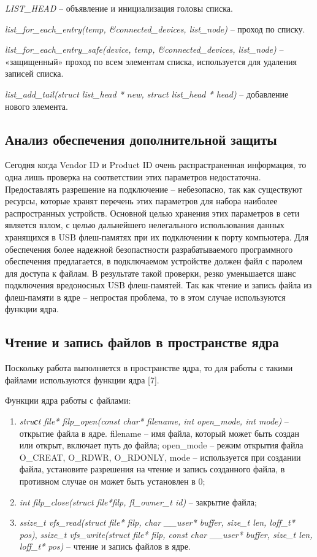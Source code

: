 \documentclass[a4paper, 10pt]{article}
\begin{document}
	\textit{LIST\_HEAD} -- объявление и инициализация головы списка.
	
	\textit{list\_for\_each\_entry(temp, \&connected\_devices, list\_node)} -- проход по списку.
	
	\textit{list\_for\_each\_entry\_safe(device, temp, \&connected\_devices, list\_node)} -- «защищенный» проход по всем элементам списка, используется для удаления записей списка.
	
	\textit{list\_add\_tail(struct list\_head * new, struct list\_head * head) }-- добавление нового элемента.
	
	\subsection{Анализ обеспечения дополнительной защиты}
		\hspace*{5mm} Сегодня когда Vendor ID и Product ID очень распрастраненная информация, то одна лишь проверка на соответствии этих параметров недостаточна. Предоставлять разрешение на подключение -- небезопасно, так как существуют ресурсы, которые хранят перечень этих параметров для набора наиболее распространных устройств. Основной целью хранения этих параметров в сети является взлом, с целью дальнейшего нелегального использования данных хранящихся в  USB флеш-памятях при их подключении к порту компьютера. Для обеспечения более надежной безопастности разрабатываемого программного обеспечения предлагается, в подключаемом устройстве должен файл с паролем для доступа к файлам. В результате такой проверки, резко уменьшается шанс подключения вредоносных USB флеш-памятей. Так как чтение и запись файла из флеш-памяти в ядре -- непростая проблема, то в этом случае используются функции ядра.
		
	\subsection{Чтение и запись файлов в пространстве ядра}
	Поскольку работа выполняется в пространстве ядра, то для работы с такими файлами используются функции ядра [7].
	
	\hspace*{-5mm}Функции ядра работы с файлами:
	\begin{enumerate}
		\item \textit{struсt file* filp\_open(const char* filename, int open\_mode, int mode)} -- открытие файла в ядре. filename -- имя файла, который может быть создан или открыт, включает путь до файла; open\_mode -- режим открытия файла O\_CREAT, O\_RDWR, O\_RDONLY, mode -- используется при создании файла, установите разрешения на чтение и запись созданного файла, в противном случае он может быть установлен в 0;
		\item	\textit{int filp\_close(struct file*filp, fl\_owner\_t id)} -- закрытие файла;
		\item 	\textit{ssize\_t vfs\_read(struct file* filp, char \_\_user* buffer, size\_t len, loff\_t* pos)}, \textit{ssize\_t vfs\_write(struct file* filp, const char \_\_user* buffer, size\_t len, loff\_t* pos)} -- чтение и запись файлов в ядре.
	\end{enumerate} 
	
\end{document}
